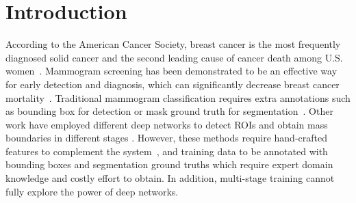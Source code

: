 \documentclass[runningheads,a4paper]{llncs}
\begin{document}
\section{Introduction}\label{sec:intro}
According to the American Cancer Society, breast cancer is the most frequently diagnosed solid cancer and the second leading cause of cancer death among U.S. women~\cite{acs}. Mammogram screening has been demonstrated to be an effective way for early detection and diagnosis, which can significantly decrease breast cancer mortality~\cite{oeffinger2015breast}. Traditional mammogram classification requires extra annotations such as bounding box for detection or mask ground truth for segmentation~\cite{varela2006use,carneiro2015unregistered,jiao2016deep}. Other work have employed different deep networks to detect ROIs and obtain mass boundaries in different stages \cite{dhungel2016automated}. However, these methods require hand-crafted features to complement the system~\cite{kooi2017large}, and training data to be annotated with bounding boxes and segmentation ground truths which require expert domain knowledge and costly effort to obtain. In addition, multi-stage training cannot fully explore the power of deep networks. %
\end{document}
